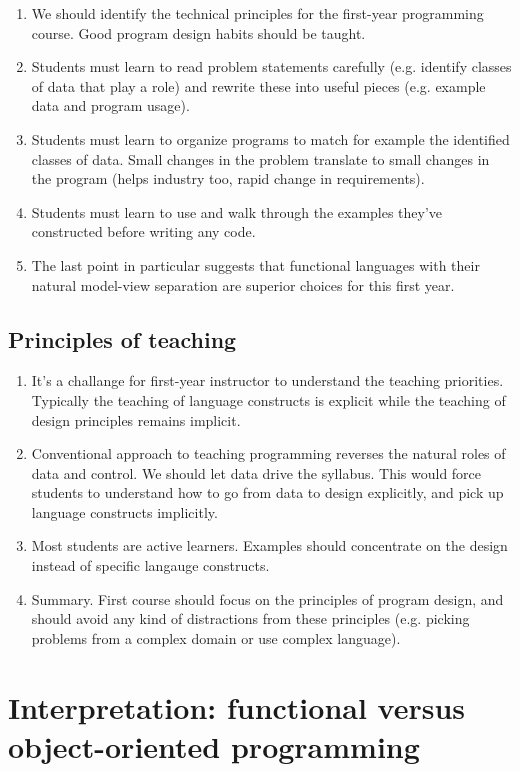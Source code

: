 \documentclass{article}
\begin{document}
\begin{enumerate}
\item We should identify the technical principles for the first-year
  programming course. Good program design habits should be taught.
\item Students must learn to read problem statements carefully
  (e.g. identify classes of data that play a role) and rewrite these
  into useful pieces (e.g. example data and program usage).
\item Students must learn to organize programs to match for example
  the identified classes of data. Small changes in the problem
  translate to small changes in the program (helps industry too, rapid
  change in requirements).
\item Students must learn to use and walk through the examples they've
  constructed before writing any code.
\item The last point in particular suggests that functional languages
  with their natural model-view separation are superior choices for
  this first year.
\end{enumerate}
  
\subsection{Principles of teaching}

\begin{enumerate}
\item It's a challange for first-year instructor to understand the
  teaching priorities. Typically the teaching of language constructs
  is explicit while the teaching of design principles remains
  implicit.
\item Conventional approach to teaching programming reverses the
  natural roles of data and control. We should let data drive the
  syllabus. This would force students to understand how to go from
  data to design explicitly, and pick up language constructs
  implicitly.
\item Most students are active learners. Examples should concentrate
  on the design instead of specific langauge constructs.
\item Summary. First course should focus on the principles of program
  design, and should avoid any kind of distractions from these
  principles (e.g. picking problems from a complex domain or use
  complex language).
\end{enumerate}

\section{Interpretation: functional versus object-oriented programming}
\end{document}
